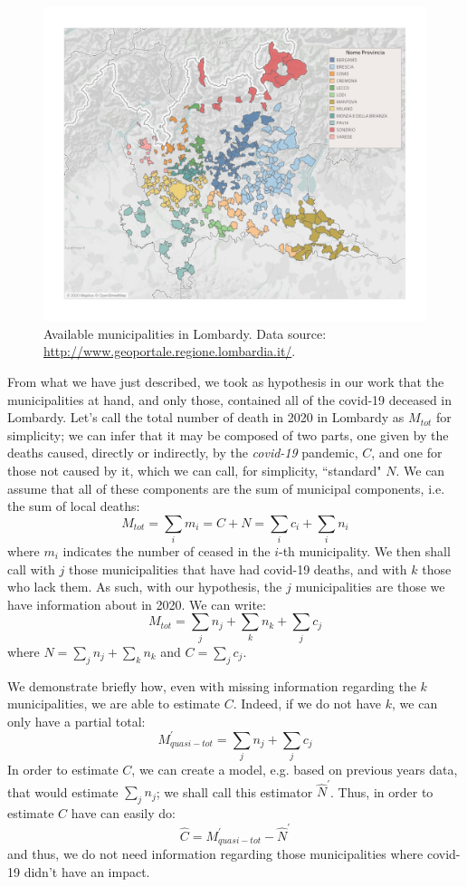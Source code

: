 \documentclass[11pt,a4paper,final]{paper}
\begin{document}
\begin{figure}[h]
\includegraphics[width=\textwidth]{../images/lombardy_municipalities.pdf}
\caption{Available municipalities in Lombardy. 
Data source: \protect\url{http://www.geoportale.regione.lombardia.it/}.}
\label{fig:comuni_dati}
\end{figure}

From what we have just described, we took as hypothesis in our work that the municipalities at hand, and only those, contained all of the covid-19 deceased in Lombardy. Let's call the total number of death in 2020 in Lombardy as $M_{tot}$ for simplicity; we can infer that it may be composed of two parts, one given by the deaths caused, directly or indirectly, by the \textit{covid-19} pandemic, $C$, and one for those not caused by it, which we can call, for simplicity, ``standard" $N$. We can assume that all of these components are the sum of municipal components, i.e. the sum of local deaths:
\[
	M_{tot} = \sum_i m_i = C + N = \sum_i c_i + \sum_i n_i
\]
where $m_i$ indicates the number of ceased in the $i$-th municipality. We then shall call with $j$ those municipalities that have had covid-19 deaths, and with $k$ those who lack them. As such, with our hypothesis, the $j$ municipalities are those we have information about in 2020. We can write:
\[
	M_{tot} = \sum_j n_j + \sum_k n_k + \sum_j c_j 
\]
where $N = \sum_j n_j + \sum_k n_k $ and $C = \sum_j c_j $. 

We demonstrate briefly how, even with missing information regarding the $k$ municipalities, we are able to estimate $C$. Indeed, if we do not have $k$, we can only have a partial total:
\[
	M^\prime_{quasi-tot} = \sum_j n_j + \sum_j c_j 
\]
In order to estimate $C$, we can create a model, e.g. based on previous years data, that would estimate $\sum_j n_j$; we shall call this estimator $\hat N^\prime$. Thus, in order to estimate $C$ have can easily do:
\[
	\hat C = M^\prime_{quasi-tot} - \hat N^ \prime
\]	
and thus, we do not need information regarding those municipalities where covid-19 didn't have an impact. 
\end{document}
